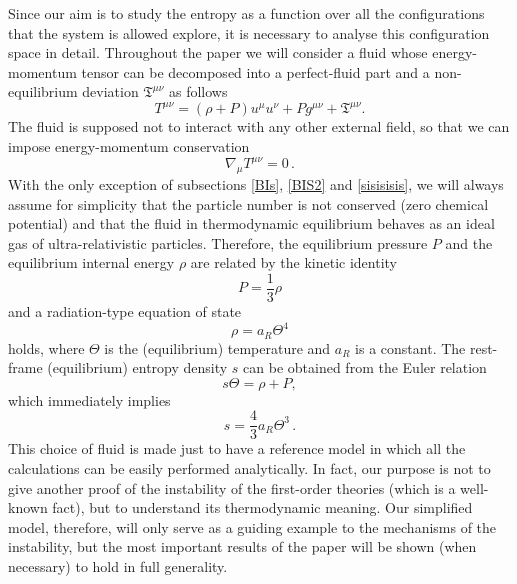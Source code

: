 \documentclass[a4paper, amsfonts, amssymb, amsmath, reprint, showkeys, nofootinbib, twoside]{revtex4-1}
\begin{document}
Since our aim is to study the entropy as a function over all the configurations that the system is allowed explore, it is necessary to analyse this configuration space in detail. Throughout the paper we will consider a fluid whose energy-momentum tensor can be decomposed into a perfect-fluid part and a  non-equilibrium deviation $\mathfrak{T}^{\mu \nu}$ as follows
\begin{equation}
T^{\mu \nu} = (\rho +P)u^\mu u^\nu +Pg^{\mu \nu} + \mathfrak{T}^{\mu \nu}.
\end{equation}
The fluid is supposed not to interact with any other external field, so that  we can impose energy-momentum conservation
\begin{equation}\label{burp}
\nabla_\mu T^{\mu \nu}=0 \, .
\end{equation}
With the only exception of subsections \ref{BIs}, \ref{BIS2} and \ref{sisisisis}, we will always  assume for simplicity that the particle number is not conserved (zero chemical potential) and that the fluid in thermodynamic equilibrium behaves as an ideal gas of ultra-relativistic particles. 
Therefore, the equilibrium pressure $P$ and the equilibrium internal energy $\rho$ are related by the kinetic identity
\begin{equation}\label{kin}
P = \dfrac{1}{3} \rho
\end{equation}
and a radiation-type equation of state
\begin{equation}\label{EOS}
\rho = a_R \Theta^4
\end{equation}
holds, where $\Theta$ is the (equilibrium) temperature and $a_R$ is a constant. 
The rest-frame (equilibrium) entropy density $s$ can be obtained from the Euler relation
\begin{equation}\label{UEU}
s\Theta = \rho +P,
\end{equation}
which immediately implies
\begin{equation}\label{sSs}
s = \dfrac{4}{3} a_R \Theta^3 \, .
\end{equation}
This choice of fluid is made just to have a reference model in which all the calculations can be easily performed analytically. In fact, our purpose is not to give another proof of the instability of the first-order theories (which is a well-known fact), but to understand its thermodynamic meaning. Our simplified model, therefore, will only serve as a guiding example to the mechanisms of the instability, but the most important results of the paper will be shown (when necessary) to hold in full generality.
\end{document}
